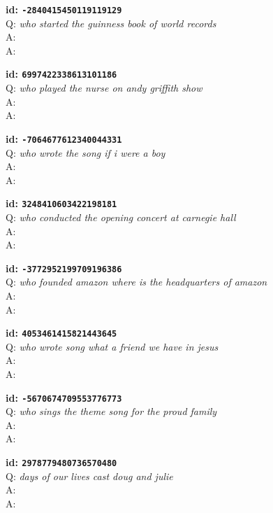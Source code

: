\tiny{\setlength{\parindent}{0cm}
\textbf{id: \texttt{-2840415450119119129}} \\
Q: \textit{who started the guinness book of world records} \\
A:  \\
A: }

\tiny{\setlength{\parindent}{0cm}
\textbf{id: \texttt{6997422338613101186}} \\
Q: \textit{who played the nurse on andy griffith show} \\
A:  \\
A: }

\tiny{\setlength{\parindent}{0cm}
\textbf{id: \texttt{-7064677612340044331}} \\
Q: \textit{who wrote the song if i were a boy} \\
A:  \\
A: }

\tiny{\setlength{\parindent}{0cm}
\textbf{id: \texttt{3248410603422198181}} \\
Q: \textit{who conducted the opening concert at carnegie hall} \\
A:  \\
A: }

\tiny{\setlength{\parindent}{0cm}
\textbf{id: \texttt{-3772952199709196386}} \\
Q: \textit{who founded amazon where is the headquarters of amazon} \\
A:  \\
A: }

\tiny{\setlength{\parindent}{0cm}
\textbf{id: \texttt{4053461415821443645}} \\
Q: \textit{who wrote song what a friend we have in jesus} \\
A:  \\
A: }

\tiny{\setlength{\parindent}{0cm}
\textbf{id: \texttt{-5670674709553776773}} \\
Q: \textit{who sings the theme song for the proud family} \\
A:  \\
A: }

\tiny{\setlength{\parindent}{0cm}
\textbf{id: \texttt{2978779480736570480}} \\
Q: \textit{days of our lives cast doug and julie} \\
A:  \\
A: }

